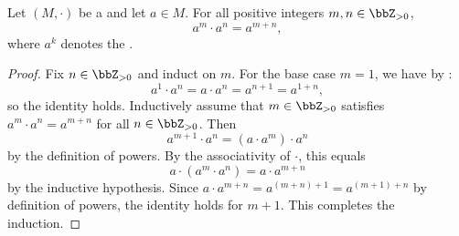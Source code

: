 \begin{lemma} \label{lemma:additivity_of_powers_in_a_semigroup}
    Let $(M,\cdot)$ be a  and let $a \in M$. For all positive integers $m,n \in \bbZ_{>0}$,
    $$a^m \cdot a^n = a^{m+n},$$
    where $a^k$ denotes the .
\end{lemma}
\begin{proof}
    Fix $n \in \bbZ_{>0}$ and induct on $m$. For the base case $m = 1$, we have by :
    $$a^1 \cdot a^n = a \cdot a^n = a^{n+1} = a^{1+n},$$
    so the identity holds. Inductively assume that $m \in \bbZ_{>0}$ satisfies $a^m \cdot a^n = a^{m+n}$ for all $n \in \bbZ_{>0}$. Then
    $$a^{m+1} \cdot a^n = (a \cdot a^m) \cdot a^n$$
    by the definition of powers. By the associativity of $\cdot$, this equals
    $$a \cdot (a^m \cdot a^n) = a \cdot a^{m+n}$$
    by the inductive hypothesis. Since $a \cdot a^{m+n} = a^{(m+n)+1} = a^{(m+1)+n}$ by definition of powers, the identity holds for $m+1$. This completes the induction.
\end{proof}
